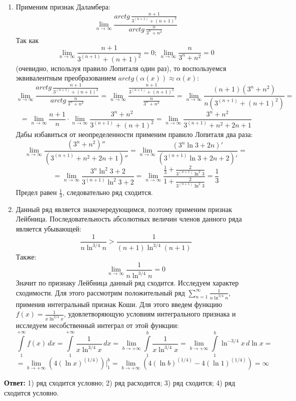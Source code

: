 \documentclass[12pt]{article}
\begin{document}
\begin{enumerate}[wide, labelwidth=!, labelindent=0pt]
		\item Применим признак Даламбера:		
		$$ \lim_{n \to \infty} \frac{arctg \, \frac{n+1}{3^{(n+1)} + (n+1)^2}}{arctg \, \frac{n}{3^n + n^2}} $$
		Так как 
		$$ \lim_{n \to \infty} \frac{n+1}{3^{(n+1)} + (n+1)^2} = 0 ;\, \lim_{n \to \infty} \frac{n}{3^n + n^2} = 0 $$
		(очевидно, используя правило Лопиталя один раз), то воспользуемся эквивалентным преобразованием $ arctg (\alpha(x)) \approx \alpha(x) $:
		$$ \lim_{n \to \infty} \frac{arctg \, \frac{n+1}{3^{(n+1)} + (n+1)^2}}{arctg \, \frac{n}{3^n + n^2}} = \lim_{n \to \infty} \frac{\frac{n+1}{3^{(n+1)} + (n+1)^2}}{ \frac{n}{3^n + n^2}} = \lim_{n \to \infty} \frac{(n+1)(3^n + n^2)}{n(3^{(n+1)} + (n+1)^2)} = $$
		$$ = \lim_{n \to \infty} \frac{n+1}{n} \cdot \lim_{n \to \infty} \frac{3^n + n^2}{3^{(n+1)} + (n+1)^2} = \lim_{n \to \infty} \frac{3^n + n^2}{3^{(n+1)} + n^2 + 2n + 1} $$
		Дабы избавиться от неопределенности применим правило Лопиталя два раза: 
		$$ \lim_{n \to \infty} \frac{(3^n + n^2)''}{(3^{(n+1)} + n^2 + 2n + 1)''} = \lim_{n \to \infty} \frac{(3^n \ln{3} + 2n)'}{(3^{(n+1)} \ln{3} + 2n + 2 )'} = $$
		$$ = \lim_{n \to \infty} \frac{3^n \ln^2{3} + 2}{3^{(n+1)} \ln^2{3} + 2 } = \lim_{n \to \infty} \frac{ \frac{1}{3} + \frac{2}{3^{(n+1)} \ln^2{3}} }{ 1 + \frac{2}{3^{(n+1)} \ln^2{3}} } = \frac{1}{3} $$
		Предел равен $ \frac{1}{3} $, следовательно ряд сходится.

		\newpage
		\item Данный ряд является знакочередующимся, поэтому применим признак Лейбница. Последовательность абсолютных величин членов данного ряда является убывающей:
		$$ \frac{1}{n \ln^{3/4} n} > \frac{1}{(n+1) \ln^{3/4} (n+1)} $$		
		Также:
		$$ \lim_{n \to \infty} \frac{1}{n \ln^{3/4} n} =  0 $$
		Значит по признаку Лейбница данный ряд сходится. Исследуем характер сходимости. Для этого рассмотрим положительный ряд $ \sum_{n=1}^{\infty} \frac{1}{n \ln^{3/4} n} $, применив интегральный признак Коши. Для этого введем функцию $ f(x) = \frac{1}{x \ln^{3/4} x} $, удовлетворяющую условиям интегрального признака и исследуем несобственный интеграл от этой функции:
		$$ \int \limits_1^{+ \infty} f(x) \, dx = \int \limits_1^{+ \infty} \frac{1}{x \ln^{3/4} x}  \, dx = \lim_{b \to + \infty} \int \limits_1^b \frac{1}{x \ln^{3/4} x} = \lim_{b \to + \infty} \int \limits_1^b \ln^{-3/4} x \, d\ln{x} = $$
		$$ = \lim_{b \to + \infty} (4 (\ln{x})^{(1/4)}) \Big|_1^b = \lim_{b \to + \infty} (4 (\ln{b})^{(1/4)} - 4 (\ln{1})^{(1/4)}) =  \infty $$
	\end{enumerate}
	\textbf{Ответ:} 1) ряд сходится условно; 2) ряд расходится; 3) ряд сходится; 4) ряд сходится условно.
\end{document}
